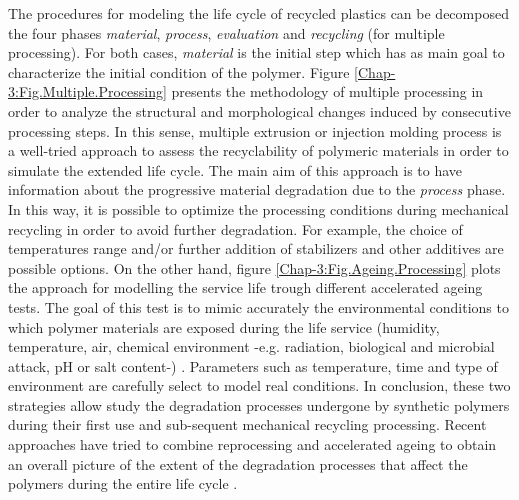 The procedures  for modeling the life cycle of recycled plastics can be decomposed the four phases \textit{material}, \textit{process}, \textit{evaluation} and \textit{recycling} (for multiple processing). 
For both cases, \textit{material} is the initial step which has as main goal to characterize the initial condition of the polymer.
Figure \ref{Chap-3:Fig.Multiple.Processing} presents the methodology of multiple processing in order to analyze  the structural and morphological changes induced by consecutive processing steps.
In this sense,  multiple extrusion or injection molding process is a well-tried  approach to assess the recyclability of  polymeric materials  in order to simulate the extended life cycle. 
The main aim of this approach is to have information about the progressive material degradation due to the \textit{process} phase.
In this way, it is possible to optimize the processing conditions during mechanical recycling in order to avoid further degradation.
For example, the choice of temperatures range and/or further addition of stabilizers and other additives are possible options.
On the other hand, figure \ref{Chap-3:Fig.Ageing.Processing} plots the approach for modelling the service life trough different accelerated ageing tests.
The goal of this test is to mimic accurately the environmental conditions to which polymer materials are exposed during the life service (humidity, temperature, air,  chemical environment -e.g. radiation, biological and microbial attack, pH or salt content-) \parencite{Vilaplana2008}.
Parameters such as temperature, time and type of environment are carefully select to model real conditions.
In conclusion, these two strategies allow study the degradation processes undergone by synthetic polymers during their first use and sub-sequent mechanical recycling processing. 
Recent approaches have tried to combine reprocessing and accelerated ageing to obtain an overall picture of the extent of the degradation processes that affect the polymers during the entire life cycle \parencite{Vilaplana2008}.
 
